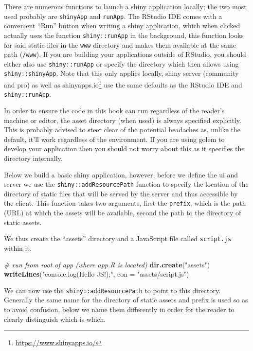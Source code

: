 \documentclass[
]{krantz}
\makeatletter
\newenvironment{Shaded}{\begin{snugshade}}{\end{snugshade}}
\newcommand{\CommentTok}[1]{\textcolor[rgb]{0.37,0.37,0.37}{\textit{#1}}}
\newcommand{\DataTypeTok}[1]{\textcolor[rgb]{0.27,0.27,0.27}{#1}}
\newcommand{\KeywordTok}[1]{\textcolor[rgb]{0.27,0.27,0.27}{\textbf{#1}}}
\newcommand{\NormalTok}[1]{#1}
\newcommand{\StringTok}[1]{\textcolor[rgb]{0.5,0.5,0.5}{#1}}
\renewcommand{\href}[2]{#2\footnote{\url{#1}}}
\newenvironment{kframe}{%
\medskip{}
\setlength{\fboxsep}{.8em}
 \def\at@end@of@kframe{}%
 \ifinner\ifhmode%
  \def\at@end@of@kframe{\end{minipage}}%
  \begin{minipage}{\columnwidth}%
 \fi\fi%
 \def\FrameCommand##1{\hskip\@totalleftmargin \hskip-\fboxsep
 \colorbox{shadecolor}{##1}\hskip-\fboxsep
     \hskip-\linewidth \hskip-\@totalleftmargin \hskip\columnwidth}%
 \MakeFramed {\advance\hsize-\width
   \@totalleftmargin\z@ \linewidth\hsize
   \@setminipage}}%
 {\par\unskip\endMakeFramed%
 \at@end@of@kframe}
\renewenvironment{Shaded}{\begin{kframe}}{\end{kframe}}
\makeatother
\begin{document}
There are numerous functions to launch a shiny application locally; the two most used probably are \texttt{shinyApp} and \texttt{runApp}. The RStudio IDE comes with a convenient ``Run'' button when writing a shiny application, which when clicked actually uses the function \texttt{shiny::runApp} in the background, this function looks for said static files in the \texttt{www} directory and makes them available at the same path (\texttt{/www}). If you are building your applications outside of RStudio, you should either also use \texttt{shiny::runApp} or specify the directory which then allows using \texttt{shiny::shinyApp}. Note that this only applies locally, shiny server (community and pro) as well as \href{https://www.shinyapps.io/}{shinyapps.io} use the same defaults as the RStudio IDE and \texttt{shiny::runApp}.

In order to ensure the code in this book can run regardless of the reader's machine or editor, the asset directory (when used) is always specified explicitly. This is probably advised to steer clear of the potential headaches as, unlike the default, it'll work regardless of the environment. If you are using golem \citep{R-golem} to develop your application then you should not worry about this as it specifies the directory internally.

Below we build a basic shiny application, however, before we define the ui and server we use the \texttt{shiny::addResourcePath} function to specify the location of the directory of static files that will be served by the server and thus accessible by the client. This function takes two arguments, first the \texttt{prefix}, which is the path (URL) at which the assets will be available, second the path to the directory of static assets.

We thus create the ``assets'' directory and a JavaScript file called \texttt{script.js} within it.

\begin{Shaded}
\begin{Highlighting}[]
\CommentTok{\# run from root of app (where app.R is located)}
\KeywordTok{dir.create}\NormalTok{(}\StringTok{"assets"}\NormalTok{)}
\KeywordTok{writeLines}\NormalTok{(}\StringTok{"console.log(\textquotesingle{}Hello JS!\textquotesingle{});"}\NormalTok{, }\DataTypeTok{con =} \StringTok{"assets/script.js"}\NormalTok{)}
\end{Highlighting}
\end{Shaded}

We can now use the \texttt{shiny::addResourcePath} to point to this directory. Generally the same name for the directory of static assets and prefix is used so as to avoid confusion, below we name them differently in order for the reader to clearly distinguish which is which.
\end{document}

